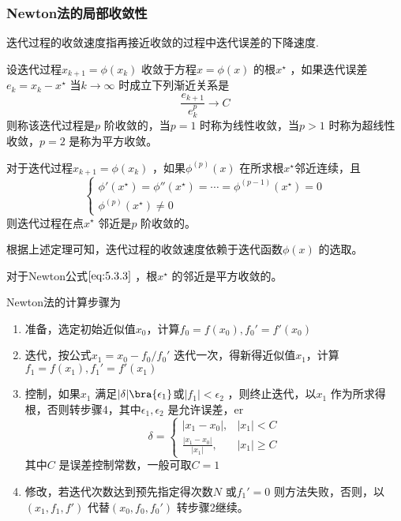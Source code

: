 \documentclass[a4paper]{article}
\begin{document}
\subsubsection{Newton法的局部收敛性}
迭代过程的收敛速度指再接近收敛的过程中迭代误差的下降速度.

\begin{definition}
	设迭代过程$x_{k+1} = \phi(x_{k})$ 收敛于方程$x = \phi(x)$ 的根$x^{\star}$ ，如果迭代误差$e_k = x_{k} - x^{\star}$ 当$k \to \infty$ 时成立下列渐近关系是
	\[
		\frac{e_{k+1}}{e_k^{p}} \to C
	\] 
	则称该迭代过程是$p$ 阶收敛的，当$p=1$ 时称为线性收敛，当$p > 1$ 时称为超线性收敛，$p=2$ 是称为平方收敛。
\end{definition}

\begin{theorem}
	对于迭代过程$x_{k+1} = \phi(x_{k})$ ，如果$\phi^{(p)}(x)$ 在所求根$x^{\star}$邻近连续，且
	\[
		\tag{5.3.4} \label{eq:5.3.4} 
	\begin{cases}
	\phi'(x^{\star}) = \phi''(x^{\star}) = \cdots = \phi^{(p-1)}(x^{\star}) = 0 \\
	\phi^{(p)}(x^{\star}) \neq 0
	\end{cases} 
	\] 
	则迭代过程在点$x^{\star}$ 邻近是$p$ 阶收敛的。
\end{theorem}
根据上述定理可知，迭代过程的收敛速度依赖于迭代函数$\phi(x)$ 的选取。

对于Newton公式$\ref{eq:5.3.3}$ ，根$x^{\star}$ 的邻近是平方收敛的。

Newton法的计算步骤为
\begin{enumerate}
	\item 准备，选定初始近似值$x_0$，计算$f_0 = f(x_0), f_0' = f'(x_0)$ 
	\item 迭代，按公式$x_1 = x_0 - f_0 / f_0'$ 迭代一次，得新得近似值$x_1$，计算$f_1 = f(x_1), f_1' = f'(x_1)$ 
	\item 控制，如果$x_1$ 满足$|\delta| \bra{ \epsilon_1}$或$|f_1| < \epsilon_2$ ，则终止迭代，以$x_1$ 作为所求得根，否则转步骤4，其中$\epsilon_1, \epsilon_2$ 是允许误差，er
		\[
		\delta = \begin{cases}
			|x_1 - x_0|, & |x_1| < C \\
			\frac{|x_1 - x_0|}{|x_1|}, & |x_1| \ge C
		\end{cases} 
		\] 
		其中$C$ 是误差控制常数，一般可取$C=1$ 
	\item 修改，若迭代次数达到预先指定得次数$N$ 或$f_1' = 0$ 则方法失败，否则，以$(x_1, f_1, f')$ 代替$(x_0, f_0, f_0')$ 转步骤2继续。
\end{enumerate}
\end{document}

